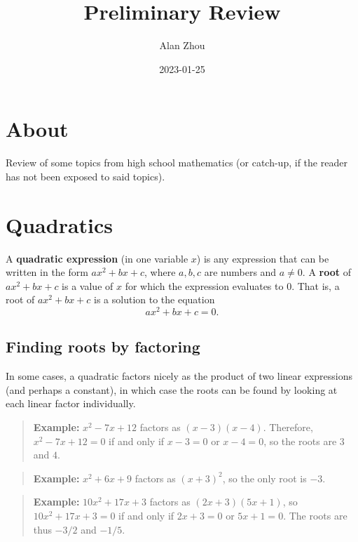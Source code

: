 \documentclass[
]{book}
\title{Preliminary Review}
\author{Alan Zhou}
\date{2023-01-25}
\theoremstyle{definition}
\theoremstyle{definition}
\theoremstyle{definition}
\theoremstyle{definition}
\theoremstyle{remark}
\begin{document}
\maketitle

{
\setcounter{tocdepth}{1}
\tableofcontents
}
\hypertarget{about}{%
\chapter*{About}\label{about}}

Review of some topics from high school mathematics (or catch-up, if the reader has not been exposed to said topics).

\hypertarget{quadratics}{%
\chapter{Quadratics}\label{quadratics}}

A \textbf{quadratic expression} (in one variable \(x\)) is any expression that can be written in the form \(ax^2 + bx + c\), where \(a, b, c\) are numbers and \(a\neq 0\). A \textbf{root} of \(ax^2 + bx + c\) is a value of \(x\) for which the expression evaluates to \(0\). That is, a root of \(ax^2 + bx + c\) is a solution to the equation
\[ax^2 + bx + c = 0.\]

\hypertarget{finding-roots-by-factoring}{%
\section{Finding roots by factoring}\label{finding-roots-by-factoring}}

In some cases, a quadratic factors nicely as the product of two linear expressions (and perhaps a constant), in which case the roots can be found by looking at each linear factor individually.

\begin{quote}
\textbf{Example:} \(x^2 - 7x + 12\) factors as \((x - 3)(x - 4)\). Therefore, \(x^2 - 7x + 12 = 0\) if and only if \(x - 3 = 0\) or \(x - 4 = 0\), so the roots are \(3\) and \(4\).
\end{quote}

\begin{quote}
\textbf{Example:} \(x^2 + 6x + 9\) factors as \((x + 3)^2\), so the only root is \(-3\).
\end{quote}

\begin{quote}
\textbf{Example:} \(10x^2 + 17x + 3\) factors as \((2x + 3)(5x + 1)\), so \(10x^2 + 17x + 3 = 0\) if and only if \(2x + 3 = 0\) or \(5x + 1 = 0\). The roots are thus \(-3/2\) and \(-1/5\).
\end{quote}
\end{document}
